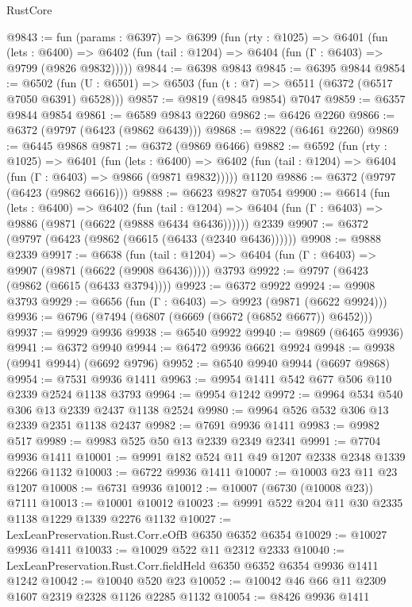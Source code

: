 \begin{lexlean}{RustCore}
\begin{coremodule}
@9843 := fun (params : @6397) =>
  @6399
    (fun (rty : @1025) =>
    @6401
      (fun (lets : @6400) =>
      @6402 (fun (tail : @1204) => @6404 (fun (Γ : @6403) => @9799 (@9826 @9832)))))
@9844 := @6398 @9843
@9845 := @6395 @9844
@9854 := @6502 (fun (U : @6501) => @6503 (fun (t : @7) => @6511 (@6372 (@6517 @7050 @6391) @6528)))
@9857 := @9819 (@9845 @9854) @7047
@9859 := @6357 @9844 @9854
@9861 := @6589 @9843 @2260
@9862 := @6426 @2260
@9866 := @6372 (@9797 (@6423 (@9862 @6439)))
@9868 := @9822 (@6461 @2260)
@9869 := @6445 @9868
@9871 := @6372 (@9869 @6466)
@9882 := @6592
    (fun (rty : @1025) =>
    @6401
      (fun (lets : @6400) =>
      @6402 (fun (tail : @1204) => @6404 (fun (Γ : @6403) => @9866 (@9871 @9832)))))
    @1120
@9886 := @6372 (@9797 (@6423 (@9862 @6616)))
@9888 := @6623 @9827 @7054
@9900 := @6614
    (fun (lets : @6400) =>
    @6402
      (fun (tail : @1204) => @6404 (fun (Γ : @6403) => @9886 (@9871 (@6622 (@9888 @6434 @6436))))))
    @2339
@9907 := @6372 (@9797 (@6423 (@9862 (@6615 (@6433 (@2340 @6436))))))
@9908 := @9888 @2339
@9917 := @6638
    (fun (tail : @1204) => @6404 (fun (Γ : @6403) => @9907 (@9871 (@6622 (@9908 @6436)))))
    @3793
@9922 := @9797 (@6423 (@9862 (@6615 (@6433 @3794))))
@9923 := @6372 @9922
@9924 := @9908 @3793
@9929 := @6656 (fun (Γ : @6403) => @9923 (@9871 (@6622 @9924)))
@9936 := @6796 (@7494 (@6807 (@6669 (@6672 (@6852 @6677)) @6452)))
@9937 := @9929 @9936
@9938 := @6540 @9922
@9940 := @9869 (@6465 @9936)
@9941 := @6372 @9940
@9944 := @6472 @9936 @6621 @9924
@9948 := @9938 (@9941 @9944) (@6692 @9796)
@9952 := @6540 @9940 @9944 (@6697 @9868)
@9954 := @7531 @9936 @1411
@9963 := @9954 @1411 @542 @677 @506 @110 @2339 @2524 @1138 @3793
@9964 := @9954 @1242
@9972 := @9964 @534 @540 @306 @13 @2339 @2437 @1138 @2524
@9980 := @9964 @526 @532 @306 @13 @2339 @2351 @1138 @2437
@9982 := @7691 @9936 @1411
@9983 := @9982 @517
@9989 := @9983 @525 @50 @13 @2339 @2349 @2341
@9991 := @7704 @9936 @1411
@10001 := @9991 @182 @524 @11 @49 @1207 @2338 @2348 @1339 @2266 @1132
@10003 := @6722 @9936 @1411
@10007 := @10003 @23 @11 @23 @1207
@10008 := @6731 @9936
@10012 := @10007 (@6730 (@10008 @23)) @7111
@10013 := @10001 @10012
@10023 := @9991 @522 @204 @11 @30 @2335 @1138 @1229 @1339 @2276 @1132
@10027 := LexLeanPreservation.Rust.Corr.eOfB @6350 @6352 @6354
@10029 := @10027 @9936 @1411
@10033 := @10029 @522 @11 @2312 @2333
@10040 := LexLeanPreservation.Rust.Corr.fieldHeld @6350 @6352 @6354 @9936 @1411 @1242
@10042 := @10040 @520 @23
@10052 := @10042 @46 @66 @11 @2309 @1607 @2319 @2328 @1126 @2285 @1132
@10054 := @8426 @9936 @1411

\end{coremodule}
\end{lexlean}
